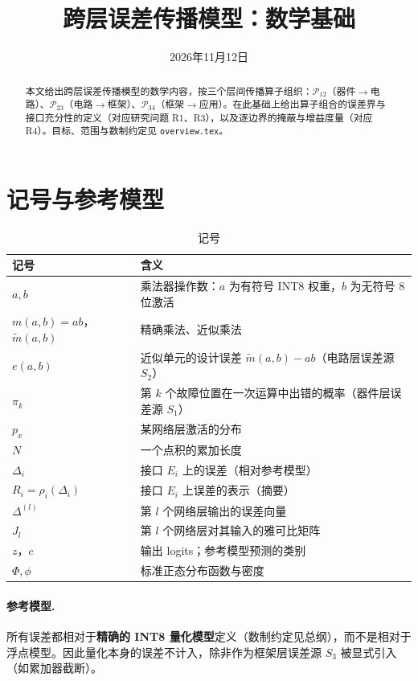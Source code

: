 \documentclass[11pt,a4paper]{ctexart}
\title{跨层误差传播模型：数学基础}
\date{2026年11月12日}
\begin{document}
\maketitle

\begin{abstract}
本文给出跨层误差传播模型的数学内容，按三个层间传播算子组织：$\mathcal{P}_{12}$（器件$\to$电路）、$\mathcal{P}_{23}$（电路$\to$框架）、$\mathcal{P}_{34}$（框架$\to$应用）。在此基础上给出算子组合的误差界与接口充分性的定义（对应研究问题 R1、R3），以及逐边界的掩蔽与增益度量（对应 R4）。目标、范围与数制约定见 \texttt{overview.tex}。
\end{abstract}

\tableofcontents

\section{记号与参考模型}

\begin{table}[h]
\centering
\small
\begin{tabularx}{\textwidth}{@{}lX@{}}
\toprule
记号 & 含义 \\
\midrule
$a, b$ & 乘法器操作数：$a$ 为有符号 INT8 权重，$b$ 为无符号 8 位激活 \\
$m(a,b)=ab$，$\tilde m(a,b)$ & 精确乘法、近似乘法 \\
$e(a,b)$ & 近似单元的设计误差 $\tilde m(a,b) - ab$（电路层误差源 $S_2$） \\
$\pi_k$ & 第 $k$ 个故障位置在一次运算中出错的概率（器件层误差源 $S_1$） \\
$p_x$ & 某网络层激活的分布 \\
$N$ & 一个点积的累加长度 \\
$\Delta_i$ & 接口 $E_i$ 上的误差（相对参考模型） \\
$R_i = \rho_i(\Delta_i)$ & 接口 $E_i$ 上误差的表示（摘要） \\
$\Delta^{(l)}$ & 第 $l$ 个网络层输出的误差向量 \\
$J_l$ & 第 $l$ 个网络层对其输入的雅可比矩阵 \\
$z$，$c$ & 输出 logits；参考模型预测的类别 \\
$\Phi, \phi$ & 标准正态分布函数与密度 \\
\bottomrule
\end{tabularx}
\caption{记号}
\end{table}

\paragraph{参考模型.}
所有误差都相对于\textbf{精确的 INT8 量化模型}定义（数制约定见总纲），而不是相对于浮点模型。因此量化本身的误差不计入，除非作为框架层误差源 $S_3$ 被显式引入（如累加器截断）。
\end{document}
